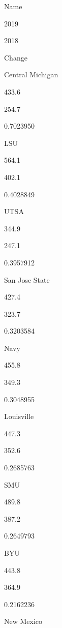 \documentclass[]{book}
\newenvironment{Shaded}{\begin{snugshade}}{\end{snugshade}}
\newcommand{\DataTypeTok}[1]{\textcolor[rgb]{0.13,0.29,0.53}{#1}}
\newcommand{\DecValTok}[1]{\textcolor[rgb]{0.00,0.00,0.81}{#1}}
\newcommand{\KeywordTok}[1]{\textcolor[rgb]{0.13,0.29,0.53}{\textbf{#1}}}
\newcommand{\NormalTok}[1]{#1}
\newcommand{\OperatorTok}[1]{\textcolor[rgb]{0.81,0.36,0.00}{\textbf{#1}}}
\newcommand{\StringTok}[1]{\textcolor[rgb]{0.31,0.60,0.02}{#1}}
\begin{document}
\begin{Shaded}
\end{Shaded}

Name

2019

2018

Change

Central Michigan

433.6

254.7

0.7023950

LSU

564.1

402.1

0.4028849

UTSA

344.9

247.1

0.3957912

San Jose State

427.4

323.7

0.3203584

Navy

455.8

349.3

0.3048955

Louisville

447.3

352.6

0.2685763

SMU

489.8

387.2

0.2649793

BYU

443.8

364.9

0.2162236

New Mexico
\end{document}
